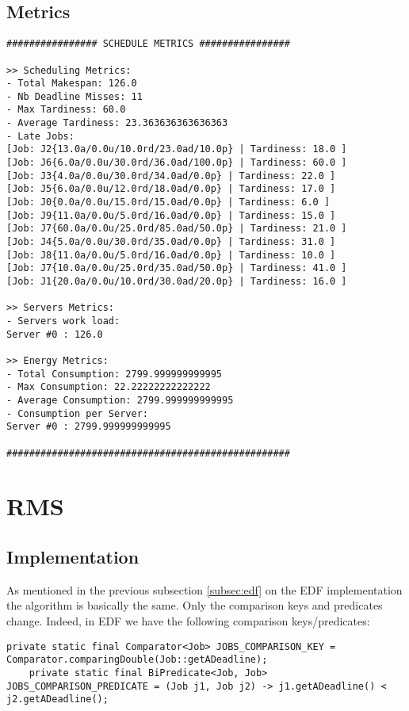 \documentclass[./report.tex]{subfiles}
\begin{document}
\subsection{Metrics}
\begin{lstlisting}[style=txt, caption={Metrics for EDF on a single server}]
################ SCHEDULE METRICS ################

>> Scheduling Metrics: 
- Total Makespan: 126.0
- Nb Deadline Misses: 11
- Max Tardiness: 60.0
- Average Tardiness: 23.363636363636363
- Late Jobs: 
[Job: J2{13.0a/0.0u/10.0rd/23.0ad/10.0p} | Tardiness: 18.0 ]
[Job: J6{6.0a/0.0u/30.0rd/36.0ad/100.0p} | Tardiness: 60.0 ]
[Job: J3{4.0a/0.0u/30.0rd/34.0ad/0.0p} | Tardiness: 22.0 ]
[Job: J5{6.0a/0.0u/12.0rd/18.0ad/0.0p} | Tardiness: 17.0 ]
[Job: J0{0.0a/0.0u/15.0rd/15.0ad/0.0p} | Tardiness: 6.0 ]
[Job: J9{11.0a/0.0u/5.0rd/16.0ad/0.0p} | Tardiness: 15.0 ]
[Job: J7{60.0a/0.0u/25.0rd/85.0ad/50.0p} | Tardiness: 21.0 ]
[Job: J4{5.0a/0.0u/30.0rd/35.0ad/0.0p} | Tardiness: 31.0 ]
[Job: J8{11.0a/0.0u/5.0rd/16.0ad/0.0p} | Tardiness: 10.0 ]
[Job: J7{10.0a/0.0u/25.0rd/35.0ad/50.0p} | Tardiness: 41.0 ]
[Job: J1{20.0a/0.0u/10.0rd/30.0ad/20.0p} | Tardiness: 16.0 ]

>> Servers Metrics: 
- Servers work load:
Server #0 : 126.0

>> Energy Metrics: 
- Total Consumption: 2799.999999999995
- Max Consumption: 22.22222222222222
- Average Consumption: 2799.999999999995
- Consumption per Server: 
Server #0 : 2799.999999999995

##################################################
\end{lstlisting}


\newpage
\section{RMS}
\subsection{Implementation}
\label{subsec:rms}

As mentioned in the previous subsection \ref{subsec:edf} on the EDF implementation the algorithm is basically the same. Only the comparison keys and predicates change. Indeed, in EDF we have the following comparison keys/predicates: 

\begin{lstlisting}[style=Java, caption={Comparison key and predicate of EDF}]
	private static final Comparator<Job> JOBS_COMPARISON_KEY = Comparator.comparingDouble(Job::getADeadline);
	private static final BiPredicate<Job, Job> JOBS_COMPARISON_PREDICATE = (Job j1, Job j2) -> j1.getADeadline() < j2.getADeadline();
\end{lstlisting}
\end{document}
